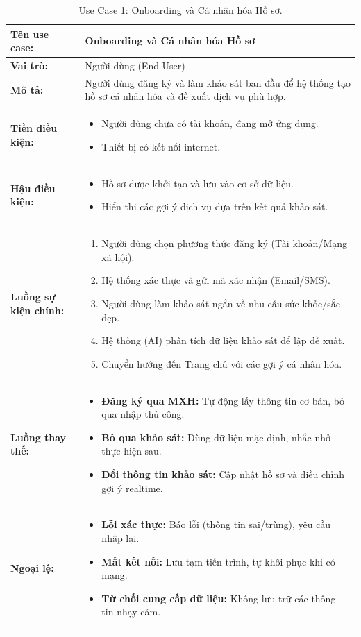 \begin{table}[H]
\centering
\begin{tabular}{|p{3cm}|p{12cm}|}
\hline
\textbf{Tên use case:} & Onboarding và Cá nhân hóa Hồ sơ \\
\hline
\textbf{Vai trò:} & Người dùng (End User) \\
\hline
\textbf{Mô tả:} & Người dùng đăng ký và làm khảo sát ban đầu để hệ thống tạo hồ sơ cá nhân hóa và đề xuất dịch vụ phù hợp. \\
\hline
\textbf{Tiền điều kiện:} & 
\begin{itemize}
\item Người dùng chưa có tài khoản, đang mở ứng dụng.
\item Thiết bị có kết nối internet.
\end{itemize} \\
\hline
\textbf{Hậu điều kiện:} & 
\begin{itemize}
\item Hồ sơ được khởi tạo và lưu vào cơ sở dữ liệu.
\item Hiển thị các gợi ý dịch vụ dựa trên kết quả khảo sát.
\end{itemize} \\
\hline
\textbf{Luồng sự kiện chính:} & 
\begin{enumerate}
\item Người dùng chọn phương thức đăng ký (Tài khoản/Mạng xã hội).
\item Hệ thống xác thực và gửi mã xác nhận (Email/SMS).
\item Người dùng làm khảo sát ngắn về nhu cầu sức khỏe/sắc đẹp.
\item Hệ thống (AI) phân tích dữ liệu khảo sát để lập đề xuất.
\item Chuyển hướng đến Trang chủ với các gợi ý cá nhân hóa.
\end{enumerate} \\
\hline
\textbf{Luồng thay thế:} & 
\begin{itemize}
\item \textbf{Đăng ký qua MXH:} Tự động lấy thông tin cơ bản, bỏ qua nhập thủ công.
\item \textbf{Bỏ qua khảo sát:} Dùng dữ liệu mặc định, nhắc nhở thực hiện sau.
\item \textbf{Đổi thông tin khảo sát:} Cập nhật hồ sơ và điều chỉnh gợi ý realtime.
\end{itemize} \\
\hline
\textbf{Ngoại lệ:} & 
\begin{itemize}
\item \textbf{Lỗi xác thực:} Báo lỗi (thông tin sai/trùng), yêu cầu nhập lại.
\item \textbf{Mất kết nối:} Lưu tạm tiến trình, tự khôi phục khi có mạng.
\item \textbf{Từ chối cung cấp dữ liệu:} Không lưu trữ các thông tin nhạy cảm.
\end{itemize} \\
\hline
\end{tabular}
\caption{Use Case 1: Onboarding và Cá nhân hóa Hồ sơ.}
\label{tab:uc1}
\end{table}

